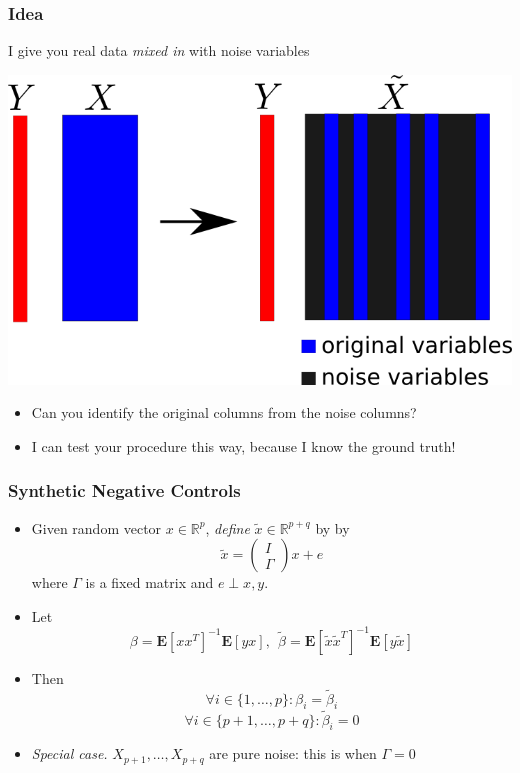 \documentclass{beamer}
\newcommand{\E}{\textbf{E}}
\begin{document}
\begin{frame}
\frametitle{Idea}
I give you real data \emph{mixed in} with noise variables
\begin{center}
\includegraphics[scale = 0.35]{anc.png}
\end{center}
\begin{itemize}
\item Can you identify the original columns from the noise columns?
\item I can test your procedure this way, because I know the ground truth!
\end{itemize}
\end{frame}

\begin{frame}
\frametitle{Synthetic Negative Controls}
\begin{itemize}
\item<1-> Given random vector $x \in \mathbb{R}^p$, \emph{define} $\tilde{x} \in \mathbb{R}^{p+q}$ by
by
\[
\tilde{x} = \begin{pmatrix}I \\ \Gamma\end{pmatrix} x + e
\]
where $\Gamma$ is a fixed matrix and $e \perp x, y$.
\item<2-> Let
\[
\beta = \E[xx^T]^{-1}\E[yx], \ \ \tilde{\beta} = \E[\tilde{x}\tilde{x}^T]^{-1} \E[y\tilde{x}]
\]
\item<3-> Then
\[
\forall i \in \{1, \hdots, p\}: \beta_i = \tilde{\beta}_i
\]
\[
\forall i \in \{p+1,\hdots, p+q\}: \tilde{\beta}_i = 0
\]
\item<4->
\emph{Special case.} $X_{p+1},\hdots, X_{p+q}$ are pure noise: this is when $\Gamma = 0$
\end{itemize}
\end{frame}
\end{document}
